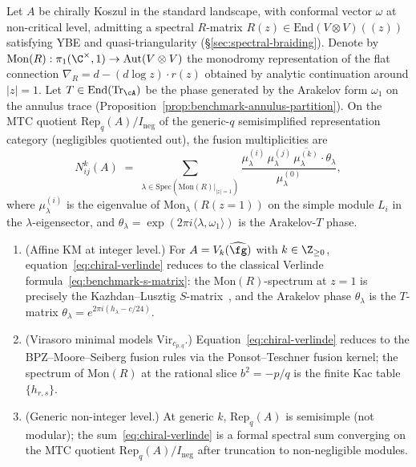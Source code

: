 \begin{theorem}
\label{thm:chiral-verlinde-spectral}
Let $A$ be chirally Koszul in the standard landscape, with
conformal vector $\omega$ at non-critical level, admitting a
spectral $R$-matrix $R(z) \in \mathrm{End}(V \otimes V)((z))$
satisfying YBE and quasi-triangularity
(\S\ref*{sec:spectral-braiding}). Denote by
$\mathrm{Mon}(R) : \pi_1(\C^\times, 1) \to
\mathrm{Aut}(V \otimes V)$ the monodromy representation of the
flat connection
$\nabla_R = d - (d\log z) \cdot r(z)$ obtained by analytic
continuation around $|z|=1$. Let $T \in
\mathrm{End}(\mathrm{Tr}_\cA)$ be the phase generated by the
Arakelov form $\omega_1$ on the annulus trace
(Proposition~\textup{\ref{prop:benchmark-annulus-partition}}). On
the MTC quotient
$\mathrm{Rep}_q(A) / I_{\mathrm{neg}}$ of the generic-$q$
semisimplified representation category
(negligibles quotiented out), the fusion multiplicities are
\begin{equation}\label{eq:chiral-verlinde}
 N^k_{ij}(A)
 \;=\;
 \sum_{\lambda \in \mathrm{Spec}(\mathrm{Mon}(R)|_{|z|=1})}
 \frac{\mu^{(i)}_\lambda \, \mu^{(j)}_\lambda \,
 \overline{\mu^{(k)}_\lambda} \cdot \theta_\lambda}
 {\mu^{(0)}_\lambda},
\end{equation}
where $\mu^{(i)}_\lambda$ is the eigenvalue of
$\mathrm{Mon}_\lambda(R(z=1))$ on the simple module $L_i$ in the
$\lambda$-eigensector, and $\theta_\lambda = \exp(2\pi i \langle
\lambda, \omega_1\rangle)$ is the Arakelov-$T$ phase.

\begin{enumerate}[label=\textup{(\roman*)},nosep]
\item \textup{(Affine KM at integer level.)}
 For $A = V_k(\widehat{\fg})$ with $k \in \Z_{\ge 0}$,
 equation~\eqref{eq:chiral-verlinde} reduces to the classical
 Verlinde formula~\eqref{eq:benchmark-s-matrix}: the
 $\mathrm{Mon}(R)$-spectrum at $z=1$ is precisely the
 Kazhdan--Lusztig $S$-matrix~\cite{KL93,BK01}, and the
 Arakelov phase $\theta_\lambda$ is the $T$-matrix
 $\theta_\lambda = e^{2\pi i (h_\lambda - c/24)}$.
\item \textup{(Virasoro minimal models $\mathrm{Vir}_{c_{p,q}}$.)}
 Equation~\eqref{eq:chiral-verlinde} reduces to the
 BPZ--Moore--Seiberg fusion rules via the Ponsot--Teschner
 fusion kernel; the spectrum of $\mathrm{Mon}(R)$ at the
 rational slice $b^2 = -p/q$ is the finite Kac table
 $\{h_{r,s}\}$.
\item \textup{(Generic non-integer level.)}
 At generic $k$, $\mathrm{Rep}_q(A)$ is semisimple (not
 modular); the sum~\eqref{eq:chiral-verlinde} is a formal
 spectral sum converging on the MTC quotient
 $\mathrm{Rep}_q(A)/I_{\mathrm{neg}}$ after truncation to
 non-negligible modules.
\end{enumerate}
\end{theorem}

